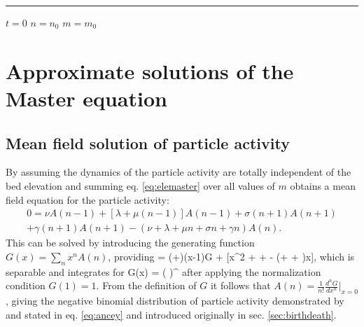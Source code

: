 \rule{\linewidth}{1pt}

\begin{algorithmic}
	\State $t = 0$ 
	\State $n = n_0$
	\State $m =  m_0$
	
	\EndWhile
\end{algorithmic}

\section{Approximate solutions of the Master equation}

\subsection{Mean field solution of particle activity}

By assuming the dynamics of the particle activity are totally independent of the bed elevation and summing eq. \ref{eq:elemaster} over all values of $m$ obtains a mean field equation for the particle activity: 
\begin{multline} 0 = \nu A(n-1) + [\lambda + \mu(n-1)]A(n-1) + \sigma(n+1)A(n+1) \\
	+\gamma(n+1)A(n+1)-(\nu  + \lambda + \mu n + \sigma n + \gamma n)A(n).\end{multline}
This can be solved by introducing the generating function \citep{Cox1965} $G(x) = \sum_n x^n A(n)$, providing
 = (\nu+\lambda)(x-1)G + [\mu x^2 + \sigma + \gamma - (\mu + \sigma + \gamma)x],\ee
which is separable and integrates for 
\be G(x) = \Bigg( \Bigg)^{\frac{\nu + \lambda}{\mu}}\ee
after applying the normalization condition $G(1)=1$.
From the definition of $G$ it follows that $A(n) = \frac{1}{n!} \frac{d^nG}{dx^n}|_{x=0}$, giving the negative binomial distribution of particle activity demonstrated by \citet{Ancey2008} and stated in eq. \ref{eq:ancey} and introduced originally in sec. \ref{sec:birthdeath}.

